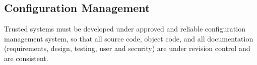         \subsection{Configuration Management}
            Trusted systems must be developed under approved and
            reliable configuration management system, so that all source
            code, object code, and all documentation (requirements,
            design, testing, user and security) are under revision
            control and are consistent.

